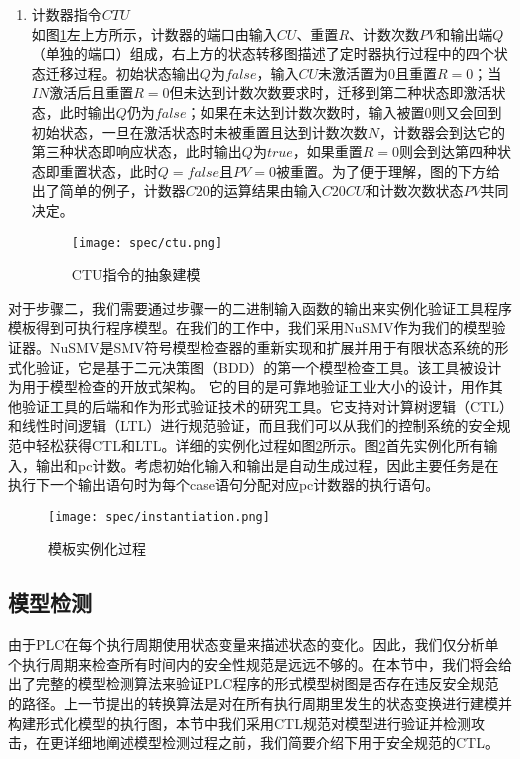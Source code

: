 \begin{enumerate}
	\item 计数器指令$CTU$\\
	如图\ref{fig23}左上方所示，计数器的端口由输入$CU$、重置$R$、计数次数$PV$和输出端$Q$（单独的端口）组成，右上方的状态转移图描述了定时器执行过程中的四个状态迁移过程。初始状态输出$Q$为$false$，输入$CU$未激活置为0且重置$R=0$；当$IN$激活后且重置$R=0$但未达到计数次数要求时，迁移到第二种状态即激活状态，此时输出$Q$仍为$false$；如果在未达到计数次数时，输入被置0则又会回到初始状态，一旦在激活状态时未被重置且达到计数次数$N$，计数器会到达它的第三种状态即响应状态，此时输出$Q$为$true$，如果重置$R=0$则会到达第四种状态即重置状态，此时$Q=false$且$PV=0$被重置。为了便于理解，图的下方给出了简单的例子，计数器$C20$的运算结果由输入$C20CU$和计数次数状态$PV$共同决定。

	\begin{figure}[!htb]
	\centering
	\texttt{[image: spec/ctu.png]}
	\caption{CTU指令的抽象建模}
	\label{fig23}
	\end{figure}
\end{enumerate}

对于步骤二，我们需要通过步骤一的二进制输入函数的输出来实例化验证工具程序模板得到可执行程序模型。在我们的工作中，我们采用NuSMV作为我们的模型验证器。NuSMV是SMV符号模型检查器的重新实现和扩展并用于有限状态系统的形式化验证，它是基于二元决策图（BDD）的第一个模型检查工具。该工具被设计为用于模型检查的开放式架构。 它的目的是可靠地验证工业大小的设计，用作其他验证工具的后端和作为形式验证技术的研究工具。它支持对计算树逻辑（CTL）和线性时间逻辑（LTL）进行规范验证，而且我们可以从我们的控制系统的安全规范中轻松获得CTL和LTL。详细的实例化过程如图\ref{fig24}所示。图\ref{fig24}首先实例化所有输入，输出和pc计数。考虑初始化输入和输出是自动生成过程，因此主要任务是在执行下一个输出语句时为每个case语句分配对应pc计数器的执行语句。

\begin{figure}[!htb]
\centering
\texttt{[image: spec/instantiation.png]}
\caption{模板实例化过程}
\label{fig24}
\end{figure}

\subsection{模型检测}

由于PLC在每个执行周期使用状态变量来描述状态的变化。因此，我们仅分析单个执行周期来检查所有时间内的安全性规范是远远不够的。在本节中，我们将会给出了完整的模型检测算法来验证PLC程序的形式模型树图是否存在违反安全规范的路径。上一节提出的转换算法是对在所有执行周期里发生的状态变换进行建模并构建形式化模型的执行图，本节中我们采用CTL规范对模型进行验证并检测攻击，在更详细地阐述模型检测过程之前，我们简要介绍下用于安全规范的CTL。


